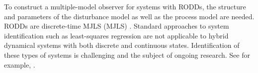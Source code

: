 {To construct a multiple-model observer for systems with \gls{RODD}s, the structure and parameters of the disturbance model as well as the process model are needed. \gls{RODD}s are discrete-time \acrlong{MJLS} (\acrshort{MJLS}) \citep{costa_discrete-time_2005}. Standard approaches to system identification such as least-squares regression are not applicable to hybrid dynamical systems with both discrete and continuous states. Identification of these types of systems is challenging and the subject of ongoing research. See for example, \cite{piga_estimation_2020}.




}
